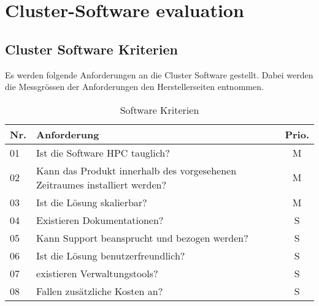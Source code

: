 \section{Cluster-Software evaluation}
\subsection{Cluster Software Kriterien}
Es werden folgende Anforderungen an die Cluster Software gestellt.
Dabei werden die Messgrössen der Anforderungen den Herstellerseiten entnommen.

\begin{table}[H]
\begin{tabular}[t]{p{0.7cm}|p{14cm}c}
\hline
\rowcolor{heading}\textbf{Nr.} & \textbf{Anforderung} & \textbf{Prio.} \\\hline
01 & Ist die Software HPC tauglich? & M \\\hline
02 & Kann das Produkt innerhalb des vorgesehenen Zeitraumes installiert werden? & M \\\hline
03 & Ist die Lösung skalierbar? &  M \\\hline
04 & Existieren Dokumentationen? & S \\\hline
05 & Kann Support beansprucht und bezogen werden? & S \\\hline
06 & Ist die Lösung benutzerfreundlich? & S \\\hline
07 & existieren Verwaltungstools? & S \\\hline
08 & Fallen zusätzliche Kosten an? & S \\\hline
\end{tabular}
\caption{Software Kriterien}
\end{table}

